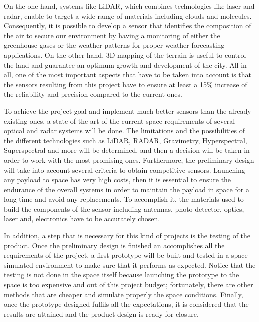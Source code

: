 On the one hand, systems like LiDAR, which combines technologies like laser and radar, enable to target a wide range of materials including clouds and molecules. Consequently, it is possible to develop a sensor that identifies the composition of the air to secure our environment by having a monitoring of either the greenhouse gases or the weather patterns for proper weather forecasting applications. On the other hand, 3D mapping of the terrain is useful to control the land and guarantee an optimum growth and development of the city. All in all, one of the most important aspects that have to be taken into account is that the sensors resulting from this project have to ensure at least a 15\% increase of the reliability and precision compared to the current ones.

To achieve the project goal and implement much better sensors than the already existing ones, a state-of-the-art of the current space requirements of several optical and radar systems will be done. The limitations and the possibilities of the different technologies such as LiDAR, RADAR, Gravimetry, Hyperspectral, Superspectral and more will be determined, and then a decision will be taken in order to work with the most promising ones. Furthermore, the preliminary design will take into account several criteria to obtain competitive sensors. Launching any payload to space has very high costs, then it is essential to ensure the endurance of the overall systems in order to maintain the payload in space for a long time and avoid any replacements. To accomplish it, the materials used to build the components of the sensor including antennas, photo-detector, optics, laser and, electronics have to be accurately chosen.

In addition, a step that is necessary for this kind of projects is the testing of the product. Once the preliminary design is finished an accomplishes all the requirements of the project, a first prototype will be built and tested in a space simulated environment to make sure that it performs as expected. Notice that the testing is not done in the space itself because launching the prototype to the space is too expensive and out of this project budget; fortunately, there are other methods that are cheaper and simulate properly the space conditions. Finally, once the prototype designed fulfils all the expectations, it is considered that the results are attained and the product design is ready for closure.